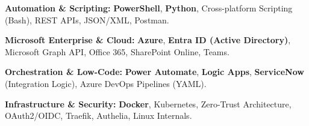 
\item \textbf{Automation \& Scripting:} \textbf{PowerShell}, \textbf{Python}, Cross-platform Scripting (Bash), REST APIs, JSON/XML, Postman.
\item \textbf{Microsoft Enterprise \& Cloud:} \textbf{Azure}, \textbf{Entra ID (Active Directory)}, Microsoft Graph API, Office 365, SharePoint Online, Teams.
\item \textbf{Orchestration \& Low-Code:} \textbf{Power Automate}, \textbf{Logic Apps}, \textbf{ServiceNow} (Integration Logic), Azure DevOps Pipelines (YAML).
\item \textbf{Infrastructure \& Security:} \textbf{Docker}, Kubernetes, Zero-Trust Architecture, OAuth2/OIDC, Traefik, Authelia, Linux Internals.

